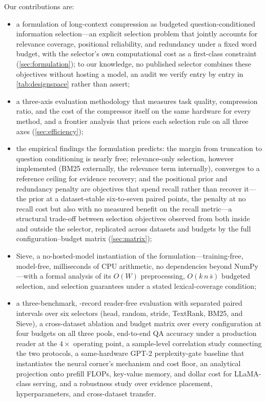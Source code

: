 \documentclass[preprint,12pt]{elsarticle}
\theoremstyle{remark}
\newcommand{\method}{Sieve}
\begin{document}
Our contributions are:
\begin{itemize}
\item a formulation of long-context compression as budgeted
question-conditioned information selection---an explicit
selection problem that jointly accounts for relevance coverage,
positional reliability, and redundancy under a fixed word budget, with
the selector's own computational cost as a first-class constraint
(\autoref{sec:formulation}); to our knowledge, no published selector
combines these objectives without hosting a model, an audit we
verify entry by entry in \autoref{tab:designspace} rather than assert;
\item a three-axis evaluation methodology that measures task quality,
compression ratio, and the cost of the compressor itself on the same
hardware for every method, and a frontier analysis that prices each
selection rule on all three axes
(\autoref{sec:efficiency});
\item the empirical findings the formulation predicts: the margin from
truncation to question conditioning is nearly free; relevance-only
selection, however implemented (BM25 externally, the relevance term
internally), converges to a reference ceiling for evidence recovery;
and the positional prior and redundancy penalty are objectives that
spend recall rather than recover it---the prior at a dataset-stable
six-to-seven paired points, the penalty at no recall cost but also
with no measured benefit on the recall metric---a structural trade-off
between selection objectives observed from both inside and outside the
selector, replicated across datasets and budgets by the full
configuration--budget matrix (\autoref{sec:matrix});
\item \method{}, a no-hosted-model instantiation of the
formulation---training-free, model-free, milliseconds of CPU
arithmetic, no dependencies beyond NumPy---with a formal analysis of
its $O(W)$ preprocessing, $O(k\,n\,\bar{s})$ budgeted selection, and
selection guarantees under a stated lexical-coverage condition;
\item a three-benchmark, \TotalRecords{}-record reader-free evaluation
with separated paired intervals over six selectors (head, random,
stride, TextRank, BM25, and \method{}), a cross-dataset ablation and
budget matrix over every configuration at four budgets on all three
pools, end-to-end QA accuracy under a
production reader at the $4\times$ operating point, a sample-level
correlation study connecting the two protocols, a same-hardware GPT-2
perplexity-gate baseline that instantiates the neural corner's
mechanism and cost floor, an analytical projection onto prefill FLOPs,
key-value memory, and dollar cost for LLaMA-class serving, and a
robustness study over evidence placement, hyperparameters, and
cross-dataset transfer.
\end{itemize}
\end{document}
